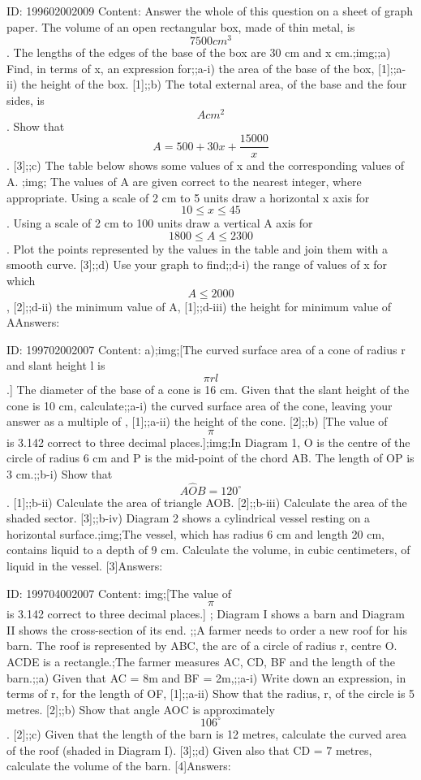\documentclass{article}
\begin{document}
ID: 199602002009
Content:
Answer the whole of this question on a sheet of graph paper. The volume of an open rectangular box, made of thin metal, is $$7500cm^3$$. The lengths of the edges of the base of the box are 30 cm and x cm.;img;;a) Find, in terms of x, an expression for;;a-i) the area of the base of the box, [1];;a-ii) the height of the box. [1];;b) The total external area, of the base and the four sides, is $$Acm^2$$. Show that $$A = 500 + 30x + \frac{15000}{x}$$. [3];;c) The table below shows some values of x and the corresponding values of A. ;img; The values of A are given correct to the nearest integer, where appropriate. Using a scale of 2 cm to 5 units draw a horizontal x axis for $$10 \leq x \leq 45$$. Using a scale of 2 cm to 100 units draw a vertical A axis for $$1800 \leq A \leq 2300$$. Plot the points represented by the values in the table and join them with a smooth curve. [3];;d) Use your graph to find;;d-i) the range of values of x for which $$A\leq 2000$$, [2];;d-ii) the minimum value of A, [1];;d-iii) the height for minimum value of AAnswers:

ID: 199702002007
Content:
a);img;[The curved surface area of a cone of radius r and slant height l is $$\pi rl$$.] The diameter of the base of a cone is 16 cm. Given that the slant height of the cone is 10 cm, calculate;;a-i) the curved surface area of the cone, leaving your answer as a multiple of \pi, [1];;a-ii) the height of the cone. [2];;b) [The value of $$\pi$$ is 3.142 correct to three decimal places.];img;In Diagram 1, O is the centre of the circle of radius 6 cm and P is the mid-point of the chord AB. The length of OP is 3 cm.;;b-i) Show that $$A \hat OB=120^{\circ}$$. [1];;b-ii) Calculate the area of triangle AOB. [2];;b-iii) Calculate the area of the shaded sector. [3];;b-iv) Diagram 2 shows a cylindrical vessel resting on a horizontal surface.;img;The vessel, which has radius 6 cm and length 20 cm, contains liquid to a depth of 9 cm. Calculate the volume, in cubic centimeters, of liquid in the vessel. [3]Answers:

ID: 199704002007
Content:
img;[The value of $$\pi$$ is 3.142 correct to three decimal places.] ; Diagram I shows a barn and Diagram II shows the cross-section of its end. ;;A farmer needs to order a new roof for his barn. The roof is represented by ABC, the arc of a circle of radius r, centre O. ACDE is a rectangle.;The farmer measures AC, CD, BF and the length of the barn.;;a) Given that AC = 8m and BF = 2m,;;a-i) Write down an expression, in terms of r, for the length of OF, [1];;a-ii) Show that the radius, r, of the circle is 5 metres. [2];;b) Show that angle AOC is approximately $$106^{\circ}$$. [2];;c) Given that the length of the barn is 12 metres, calculate the curved area of the roof (shaded in Diagram I). [3];;d) Given also that CD = 7 metres, calculate the volume of the barn. [4]Answers:
\end{document}
